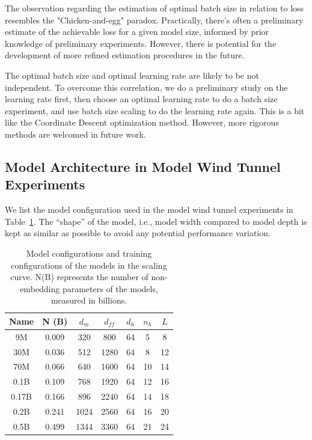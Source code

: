 The observation regarding the estimation of optimal batch size in relation to loss resembles the "Chicken-and-egg" paradox. Practically, there's often a preliminary estimate of the achievable loss for a given model size, informed by prior knowledge of preliminary experiments. However, there is potential for the development of more refined estimation procedures in the future.

The optimal batch size and optimal learning rate are likely to be not independent. To overcome this correlation, we do a preliminary study on the learning rate first, then choose an optimal learning rate to do a batch size experiment, and use batch size scaling to do the learning rate again. This is a bit like the Coordinate Descent optimization method. However, more rigorous methods are welcomed in future work.


\subsection{Model Architecture in Model Wind Tunnel Experiments}
We list the model configuration used in the model wind tunnel experiments in Table~\ref{tab:appmodel_configs}. The ``shape'' of the model, i.e., model width compared to model depth is kept as similar as possible to avoid any potential performance variation.

\begin{table}[htbp]
    \centering
    \begin{tabular}{c|cccccc}
    \toprule
        \textbf{Name} & \textbf{N (B)}& $d_m$ & $d_{ff}$ &$d_h$ & $n_h$ & $L$ \\
    \midrule
          9M    &  0.009 & 320 & 800 & 64 & 5 & 8\\
           30M &   0.036 & 512 & 1280 & 64 & 8 & 12  \\
          70M &  0.066 & 640 & 1600 & 64 & 10 & 14\\
          0.1B &  0.109 & 768 & 1920 & 64 & 12 & 16  \\
         0.17B &  0.166 & 896 & 2240 & 64 & 14 & 18 \\
         0.2B&  0.241 & 1024 & 2560 & 64 & 16 & 20 \\
        0.5B& 0.499 & 1344 & 3360 & 64 & 21 & 24 \\
    \bottomrule
    \end{tabular}
    \caption{Model configurations and training configurations of the models in the scaling curve. N(B) represents the number of non-embedding parameters of the models, measured in billions. 
    }
    \label{tab:appmodel_configs}
\end{table}


